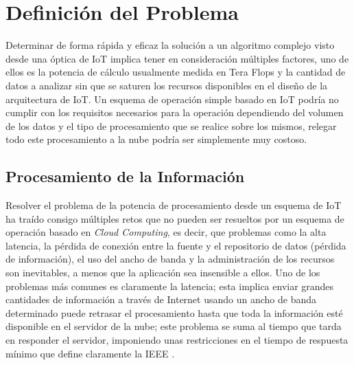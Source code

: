 
\chapter{Definición del Problema} %
\label{Chapter2}


Determinar de forma rápida y eficaz la solución a un algoritmo complejo visto desde una óptica de IoT implica tener en consideración múltiples factores, uno de ellos es la potencia de cálculo usualmente medida en Tera Flops y la cantidad de datos a analizar sin que se saturen los recursos disponibles en el diseño de la arquitectura de IoT. Un esquema de operación simple basado en IoT podría no cumplir con los requisitos necesarios para la operación dependiendo del volumen de los datos y el tipo de procesamiento que se realice sobre los mismos, relegar todo este procesamiento a la nube podría ser simplemente muy costoso.



\section{Procesamiento de la Información}

Resolver el problema de la potencia de procesamiento desde un esquema de IoT ha traído consigo múltiples retos que no pueden ser resueltos por un esquema de operación basado en \textit{Cloud Computing}, es decir, que problemas como la alta latencia, la pérdida de conexión entre la fuente y el repositorio de datos (pérdida de información), el uso del ancho de banda y la administración de los recursos son inevitables, a menos que la aplicación sea insensible a ellos. Uno de los problemas más comunes es claramente la latencia; esta implica enviar grandes cantidades de información a través de Internet usando un ancho de banda determinado puede retrasar el procesamiento hasta que toda la información esté disponible en el servidor de la nube; este problema se suma al tiempo que tarda en responder el servidor, imponiendo unas restricciones en el tiempo de respuesta mínimo que define claramente la IEEE \citep{RTSSystems,FogBonomi}.

